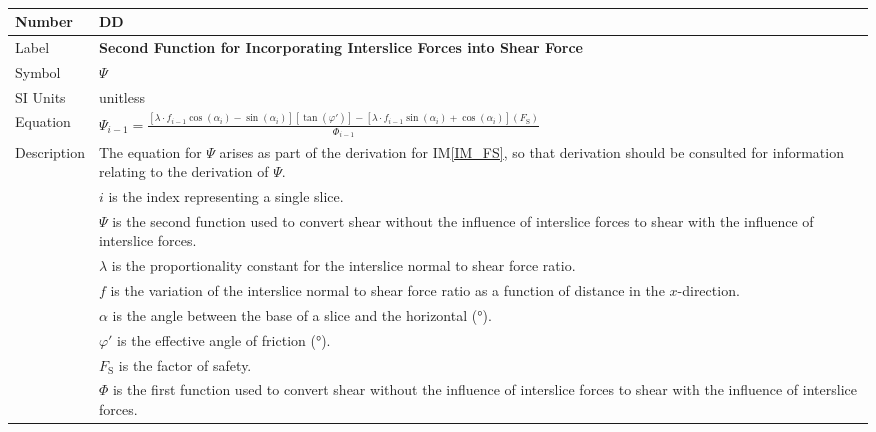 \documentclass[12pt]{article}
\newcommand{\colAwidth}{0.13\textwidth}
\newcommand{\colBwidth}{0.82\textwidth}
\renewcommand{\arraystretch}{1}
\newcommand{\iref}[1]{IM\ref{#1}}
\newcounter{datadefnum} %
\newcounter{defnum} %
\begin{document}

~\newline


\noindent
\begin{minipage}{\textwidth}
	\renewcommand*{\arraystretch}{1.6}
	\begin{tabular}{| p{\colAwidth} | p{\colBwidth} |}
		
		\hline \rowcolor[gray]{0.9} Number&
		DD{datadefnum}\thedatadefnum \label{DD_Psi}\\
		
		\hline Label& \bf Second Function for Incorporating Interslice Forces 
		into Shear Force\\
		\hline Symbol& $\Psi$\\
		\hline SI Units& unitless\\
		
		\hline
		Equation & 
		$\Psi_{i-1} = \frac{\left[ \lambda \cdot f_{i-1}
		\cos\left(\alpha_{i}\right) -
		\sin\left(\alpha_{i}\right) \right]\left[
		\tan\left(\varphi'\right) \right] - \left[ \lambda \cdot
		f_{i-1} \sin\left(\alpha_{i}\right) +
		\cos\left(\alpha_{i}\right) \right] \left( F_\text{S}
		\right)}{\Phi_{i-1}}$\\
		
		\hline Description &The equation for $\Psi$ arises as part of the 
		derivation for \iref{IM_FS}, so that derivation should be consulted for 
		information relating to the derivation of $\Psi$.\\
		&$i$ is the index representing a single slice.\\
		&$\Psi$ is the second function used to convert shear without the 
		influence of interslice forces to shear with the influence of 
		interslice forces.\\
		&$\lambda$ is the proportionality constant for the interslice normal to 
		shear force ratio.\\
		&$f$ is the variation of the interslice normal to shear force ratio as 
		a function of distance in the $x$-direction.\\
		&$\alpha$ is the angle between the base of a slice and the horizontal 
		(\si{\degree}).\\
		&$\varphi'$ is the effective angle of friction (\si{\degree}).\\
		&$F_\text{S}$ is the factor of safety.\\
		&$\Phi$ is the first function used to convert shear without the 
		influence of interslice forces to shear with the influence of 
		interslice forces.\\
		

\end{tabular}
\end{minipage}
\end{document}
